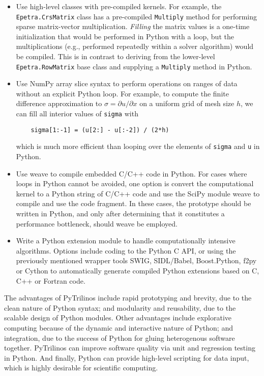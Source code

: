 \documentclass[11pt]{article}
\begin{document}
\begin{itemize}

\item Use high-level classes with pre-compiled kernels.  For example, the {\tt Epetra.CrsMatrix} class has a pre-compiled {\tt Multiply} method for performing sparse matrix-vector multiplication.  {\em Filling} the matrix values is a one-time initialization that would be performed in Python with a loop, but the multiplications (e.g., performed repeatedly within a solver algorithm) would be compiled.  This is in contrast to deriving from the lower-level {\tt Epetra.RowMatrix} base class and supplying a {\tt Multiply} method in Python.

\item Use NumPy array slice syntax to perform operations on ranges of data without an explicit Python loop.  For example, to compute the finite difference approximation to $\sigma = \partial u/\partial x$ on a uniform grid of mesh size $h$, we can fill all interior values of {\tt sigma} with

\begin{verbatim}
    sigma[1:-1] = (u[2:] - u[:-2]) / (2*h)
\end{verbatim}

which is much more efficient than looping over the elements of {\tt sigma} and {\tt u} in Python.

\item Use weave to compile embedded C/C++ code in Python.  For cases where loops in Python cannot be avoided, one option is convert the computational kernel to a Python string of C/C++ code and use the SciPy module weave to compile and use the code fragment.  In these cases, the prototype should be written in Python, and only after determining  that it constitutes a performance bottleneck, should weave be employed.

\item Write a Python extension module to handle computationally intensive algorithms.  Options include coding to the Python C API, or using the previously mentioned wrapper tools SWIG, SIDL/Babel, Boost.Python, f2py or Cython to automatically generate compiled Python extensions based on C, C++ or Fortran code. 
\end{itemize}

The advantages of PyTrilinos include rapid prototyping and brevity, due to the clean nature of Python syntax; and modularity and reusability, due to the scalable design of Python modules.  Other advantages include explorative computing because of the dynamic and interactive nature of Python; and integration, due to the success of Python for gluing heterogenous software together.  PyTrilinos can improve software quality via unit and regression testing in Python.  And finally, Python can provide high-level scripting for data input, which is highly desirable for scientific computing.
\end{document}
